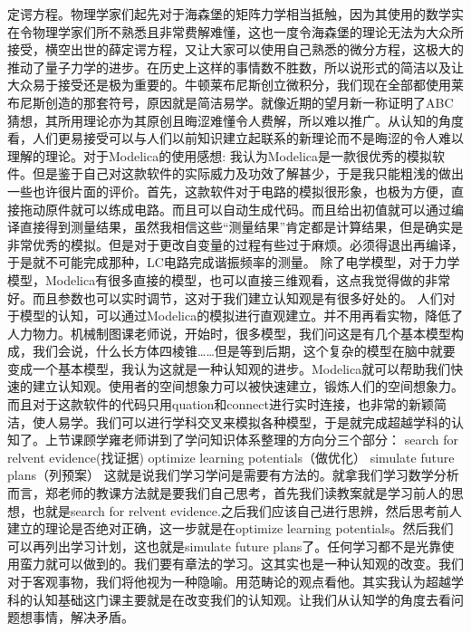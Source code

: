 \documentclass[11pt,fleqn]{book}
\numberwithin{dummy}{section}
\theoremstyle{ocrenumbox}
\theoremstyle{blacknumex}
\theoremstyle{blacknumbox}
\theoremstyle{ocrenum}
\newenvironment{remark}[1]{\par\vspace{10pt}\small %
	\begin{list}{}{
			\leftmargin=35pt %
			\rightmargin=25pt}\item\ignorespaces %
		\makebox[-2.5pt]{\begin{tikzpicture}[overlay]
			\node[draw=ocre!60,line width=1pt,circle,fill=ocre!25,font=\sffamily\bfseries,inner sep=2pt,outer sep=0pt] at (-15pt,0pt){\textcolor{ocre}{#1}};\end{tikzpicture}} %
		\advance\baselineskip -1pt}{\end{list}\vskip5pt} %
\newlength\esp
\begin{document}
\begin{remark}{刘}
定谔方程。物理学家们起先对于海森堡的矩阵力学相当抵触，因为其使用的数学实在令物理学家们所不熟悉且非常费解难懂，这也一度令海森堡的理论无法为大众所接受，横空出世的薛定谔方程，又让大家可以使用自己熟悉的微分方程，这极大的推动了量子力学的进步。在历史上这样的事情数不胜数，所以说形式的简洁以及让大众易于接受还是极为重要的。牛顿莱布尼斯创立微积分，我们现在全部都使用莱布尼斯创造的那套符号，原因就是简洁易学。就像近期的望月新一称证明了ABC猜想，其所用理论亦为其原创且晦涩难懂令人费解，所以难以推广。从认知的角度看，人们更易接受可以与人们以前知识建立起联系的新理论而不是晦涩的令人难以理解的理论。对于Modelica的使用感想:	我认为Modelica是一款很优秀的模拟软件。但是鉴于自己对这款软件的实际威力及功效了解甚少，于是我只能粗浅的做出一些也许很片面的评价。首先，这款软件对于电路的模拟很形象，也极为方便，直接拖动原件就可以练成电路。而且可以自动生成代码。而且给出初值就可以通过编译直接得到测量结果，虽然我相信这些“测量结果”肯定都是计算结果，但是确实是非常优秀的模拟。但是对于更改自变量的过程有些过于麻烦。必须得退出再编译，于是就不可能完成那种，LC电路完成谐振频率的测量。	除了电学模型，对于力学模型，Modelica有很多直接的模型，也可以直接三维观看，这点我觉得做的非常好。而且参数也可以实时调节，这对于我们建立认知观是有很多好处的。	人们对于模型的认知，可以通过Modelica的模拟进行直观建立。并不用再看实物，降低了人力物力。机械制图课老师说，开始时，很多模型，我们问这是有几个基本模型构成，我们会说，什么长方体四棱锥……但是等到后期，这个复杂的模型在脑中就要变成一个基本模型，我认为这就是一种认知观的进步。Modelica就可以帮助我们快速的建立认知观。使用者的空间想象力可以被快速建立，锻炼人们的空间想象力。而且对于这款软件的代码只用quation和connect进行实时连接，也非常的新颖简洁，使人易学。我们可以进行学科交叉来模拟各种模型，于是就完成超越学科的认知了。上节课顾学雍老师讲到了学问知识体系整理的方向分三个部分：	search for relvent evidence(找证据)  optimize learning potentials（做优化）	simulate future plans（列预案）	这就是说我们学习学问是需要有方法的。就拿我们学习数学分析而言，郑老师的教课方法就是要我们自己思考，首先我们读教案就是学习前人的思想，也就是search for relvent evidence.之后我们应该自己进行思辨，然后思考前人建立的理论是否绝对正确，这一步就是在optimize learning potentials。然后我们可以再列出学习计划，这也就是simulate future plans了。任何学习都不是光靠使用蛮力就可以做到的。我们要有章法的学习。这其实也是一种认知观的改变。我们对于客观事物，我们将他视为一种隐喻。用范畴论的观点看他。其实我认为超越学科的认知基础这门课主要就是在改变我们的认知观。让我们从认知学的角度去看问题想事情，解决矛盾。
\end{remark}
\end{document}
